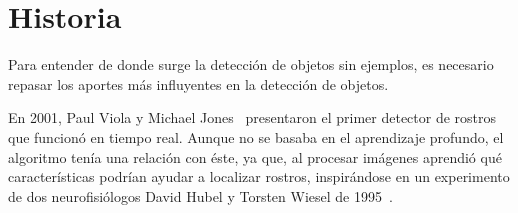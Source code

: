 \section{Historia} \label{sec:historia}

Para entender de donde surge la detección de objetos sin ejemplos, es necesario repasar los aportes más influyentes en la detección de objetos. 

En 2001, Paul Viola y Michael Jones~\cite{viola2001rapid} presentaron el primer detector de rostros que funcionó en tiempo real. Aunque no se basaba en el aprendizaje profundo, el algoritmo tenía una relación con éste, ya que, al procesar imágenes aprendió qué características podrían ayudar a localizar rostros, inspirándose en un experimento de dos neurofisiólogos David Hubel y Torsten Wiesel de 1995~\cite{hubel1959receptive}.

